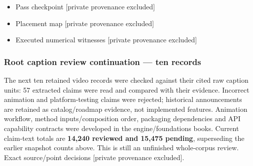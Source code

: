 \begin{itemize}
\tightlist
\item
  {Pass checkpoint {[}private provenance excluded{]}}
\item
  {Placement map {[}private provenance excluded{]}}
\item
  {Executed numerical witnesses {[}private provenance excluded{]}}
\end{itemize}

\subsubsection{Root caption review continuation --- ten records}\label{appendix-5056f3debc1f-root-caption-review-continuation-ten-records}

The next ten retained video records were checked against their cited raw caption units: 57 extracted claims were read and compared with their evidence. Incorrect animation and platform-testing claims were rejected; historical announcements are retained as catalog/roadmap evidence, not implemented features. Animation workflow, method inputs/composition order, packaging dependencies and API capability contracts were developed in the engine/foundations books. Current claim-text totals are \textbf{14,240 reviewed and 15,475 pending}, superseding the earlier snapshot counts above. This is still an unfinished whole-corpus review. {Exact source/point decisions {[}private provenance excluded{]}}.
